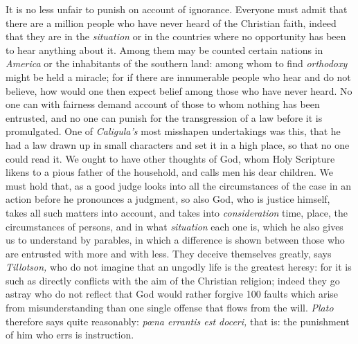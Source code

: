 \documentclass[12pt,a4paper,openany]{book}
\newcommand{\opage}[1]{\marginnote{\footnotesize\textit{[#1]}}}
\begin{document}
It is no less unfair to punish on account of ignorance. Everyone must admit that
there are a million people who have never heard of the Christian faith, indeed
that they are in the \textit{situation} or in the countries where no opportunity
has been to hear anything about it. Among them may be counted certain nations in
\textit{America} or the inhabitants of the southern land: among whom to find
\textit{orthodoxy} might be held a miracle; for if there are innumerable people
who hear and do not believe, how would one then expect belief among those who have
never
\setcounter{footnote}{0}%
\opage{25}heard.
No one can with fairness demand account of those to whom nothing has been entrusted,
and no one can punish for the transgression of a law before it is promulgated. One
of \textit{Caligula's} most misshapen undertakings was this, that he had a law
drawn up in small characters and set it in a high place, so that no one could read
it. We ought to have other thoughts of God, whom Holy Scripture likens to a pious
father of the household, and calls men his dear children. We must hold that, as a
good judge looks into all the circumstances of the case in an action before he
pronounces a judgment, so also God, who is justice himself, takes all such
matters into account, and takes into \textit{consideration} time, place, the
circumstances of persons, and in what \textit{situation} each one is, which he
also gives us to understand by parables, in which a difference is shown between
those who are entrusted with more and with less. They deceive themselves greatly,
says \textit{Tillotson,} who do not imagine that an ungodly life is the greatest
heresy: for it is such as directly conflicts with the aim of the Christian
religion; indeed they go astray who do not reflect that God would rather forgive
100 faults which arise from misunderstanding than one single offense that flows
from the will. \textit{Plato} therefore says quite reasonably: \textit{pœna errantis
est doceri,} that is: the punishment of him who errs is instruction.
\end{document}
